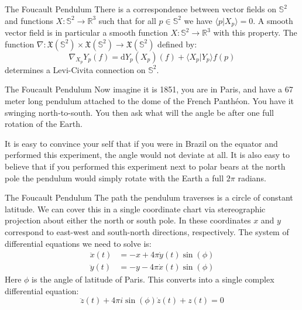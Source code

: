 \documentclass{beamer}
\begin{document}
    \begin{frame}{The Foucault Pendulum}
        There is a correspondence between vector fields on $\mathbb{S}^{2}$ and
        functions $X:\mathbb{S}^{2}\rightarrow\mathbb{R}^{3}$ such that
        for all $p\in\mathbb{S}^{2}$ we have
        $\langle{p}|X_{p}\rangle=0$. A smooth vector field is in particular a
        smooth function $X:\mathbb{S}^{2}\rightarrow\mathbb{R}^{3}$ with this
        property. The function
        $\nabla:\mathfrak{X}(\mathbb{S}^{2})\times\mathfrak{X}(\mathbb{S}^{2})%
            \rightarrow\mathfrak{X}(\mathbb{S}^{2})$ defined by:
        \begin{equation}
            \nabla_{X_{p}}Y_{p}(f)=
            \textrm{d}Y_{p}(X_{p})(f)+\langle{X}_{p}|Y_{p}\rangle{f}(p)
        \end{equation}
        determines a Levi-Civita connection on $\mathbb{S}^{2}$.
    \end{frame}
    \begin{frame}{The Foucault Pendulum}
        Now imagine it is 1851, you are in Paris, and have a 67 meter long
        pendulum attached to the dome of the French Panth\'{e}on. You have it
        swinging north-to-south. You then ask what will the angle be after one
        full rotation of the Earth.
        \par\hfill\par
        It is easy to convince your self that if you were in Brazil on the
        equator and performed this experiment, the angle would not deviate at
        all. It is also easy to believe that if you performed this experiment
        next to polar bears at the north pole the pendulum would simply rotate
        with the Earth a full $2\pi$ radians.
    \end{frame}
    \begin{frame}{The Foucault Pendulum}
        The path the pendulum traverses is a circle of constant latitude.
        We can cover this in a single coordinate chart via stereographic
        projection about either the north or south pole. In these coordinates
        $x$ and $y$ correspond to east-west and south-north directions,
        respectively. The system of differential equations we need to solve is:
        \begin{align}
            \ddot{x}(t)&=-x+4\pi\dot{y}(t)\sin(\phi)\\
            \ddot{y}(t)&=-y-4\pi\dot{x}(t)\sin(\phi)
        \end{align}
        Here $\phi$ is the angle of latitude of Paris. This converts into a
        single complex differential equation:
        \begin{equation}
            \ddot{z}(t)+4\pi{i}\sin(\phi)\dot{z}(t)+z(t)=0
        \end{equation}
    \end{frame}
\end{document}
